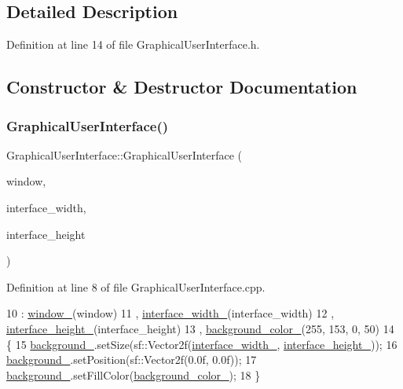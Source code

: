 \subsection{Detailed Description}


Definition at line 14 of file Graphical\+User\+Interface.\+h.



\subsection{Constructor \& Destructor Documentation}
\mbox{\label{classGraphicalUserInterface_a53c95b6d9e7a7b1f04b60d925a8e2e7b}} 
\subsubsection{\texorpdfstring{Graphical\+User\+Interface()}{GraphicalUserInterface()}}
{\footnotesize\ttfamily Graphical\+User\+Interface\+::\+Graphical\+User\+Interface (\begin{DoxyParamCaption}\item[{sf\+::\+Render\+Window \&}]{window,  }\item[{const int}]{interface\+\_\+width,  }\item[{const int}]{interface\+\_\+height }\end{DoxyParamCaption})\hspace{0.3cm}{\ttfamily [explicit]}}



Definition at line 8 of file Graphical\+User\+Interface.\+cpp.


\begin{DoxyCode}
10     : \hyperlink{classGraphicalUserInterface_ae51adeb759a97196eda3b37bfc80a452}{window\_}(window)
11     , \hyperlink{classGraphicalUserInterface_ae3c07ea59e557909f92882028fafb0a3}{interface\_width\_}(interface\_width)
12     , \hyperlink{classGraphicalUserInterface_a2e867c6d5b0d903d9e16e9934af93fc1}{interface\_height\_}(interface\_height)
13     , \hyperlink{classGraphicalUserInterface_a0361d82710bb150c272a2a760164241f}{background\_color\_}(255, 153, 0, 50)
14 \{
15     \hyperlink{classGraphicalUserInterface_a6d706ef82ec59d143a009331b40681bb}{background\_}.setSize(sf::Vector2f(\hyperlink{classGraphicalUserInterface_ae3c07ea59e557909f92882028fafb0a3}{interface\_width\_}, 
      \hyperlink{classGraphicalUserInterface_a2e867c6d5b0d903d9e16e9934af93fc1}{interface\_height\_}));
16     \hyperlink{classGraphicalUserInterface_a6d706ef82ec59d143a009331b40681bb}{background\_}.setPosition(sf::Vector2f(0.0f, 0.0f));
17     \hyperlink{classGraphicalUserInterface_a6d706ef82ec59d143a009331b40681bb}{background\_}.setFillColor(\hyperlink{classGraphicalUserInterface_a0361d82710bb150c272a2a760164241f}{background\_color\_});
18 \}
\end{DoxyCode}


